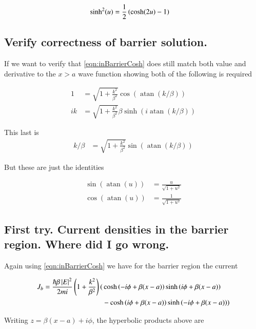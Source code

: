 \documentclass{article}
\DeclareMathOperator{\atan}{atan}
\begin{document}
\begin{align}\label{eqn:sinhSquared}
\sinh^2(u) 
&=
\frac{1}{2} \left( \cosh(2u) -1 \right) 
\end{align}

\subsection{ Verify correctness of barrier solution. }

If we want to verify that \ref{eqn:inBarrierCosh} 
does still match both value and derivative to the $x>a$ wave function
showing both of the following is required

\begin{align*}
1 &= \sqrt{1 + \frac{k^2}{\beta^2}} \cos\left( \atan(k/\beta) \right) \\
ik &=
\sqrt{1 + \frac{k^2}{\beta^2}} \beta \sinh\left( i \atan(k/\beta) \right)
\end{align*}

This last is
\begin{align*}
k/\beta &=
\sqrt{1 + \frac{k^2}{\beta^2}} \sin\left( \atan(k/\beta) \right)
\end{align*}

But these are just the identities

\begin{align*}
\sin\left( \atan(u) \right) &= \frac{u}{\sqrt{1 + u^2}} \\
\cos\left( \atan(u) \right) &= \frac{1}{\sqrt{1 + u^2}}
\end{align*}

\subsection{ First try.  Current densities in the barrier region.  Where did I go wrong. }

Again using \ref{eqn:inBarrierCosh} we have for the barrier region the current

\begin{align*}
J_b
= \frac{\hbar \beta \left\lvert{E}\right\rvert^2}{2mi} \left(1 + \frac{k^2}{\beta^2} \right)
( 
&\cosh\left( -i\phi + \beta(x-a) \right) 
\sinh\left( i\phi + \beta(x-a) \right) \\
&-
\cosh\left( i\phi + \beta(x-a) \right) 
\sinh\left( -i\phi + \beta(x-a) \right) 
) \\
\end{align*}

Writing $z = \beta(x-a) + i\phi$, the hyperbolic products above are
\end{document}
